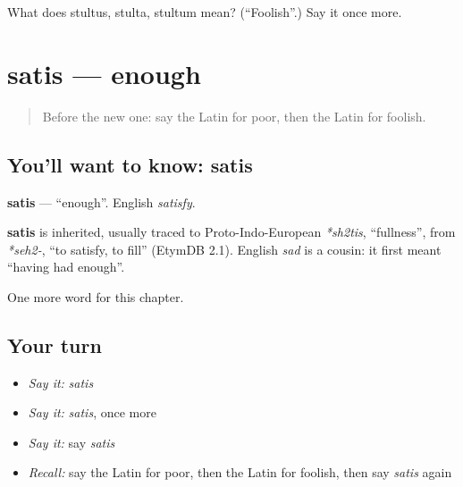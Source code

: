 \begin{tcolorbox}[breakable,colback=teal!4,colframe=teal!35!black,title={Before you move on}]
What does stultus, stulta, stultum mean? (\textquotedblleft{}Foolish\textquotedblright{}.) Say it once more.
\end{tcolorbox}
\section[satis]{satis — enough}

\label{lesson:LA-C98-satis}



\begin{quote}
Before the new one: say the Latin for poor, then the Latin for foolish.
\end{quote}

\subsection*{You'll want to know: satis}
\textbf{satis} — \textquotedblleft{}enough\textquotedblright{}. English \emph{satisfy}.

\begin{cousinweb}
\textbf{satis} is inherited, usually traced to Proto-Indo-European \emph{*sh2tis}, \textquotedblleft{}fullness\textquotedblright{}, from \emph{*seh2-}, \textquotedblleft{}to satisfy, to fill\textquotedblright{} (EtymDB 2.1). English \emph{sad} is a cousin: it first meant \textquotedblleft{}having had enough\textquotedblright{}.
\end{cousinweb}

\begin{grammarlens}[title={What you've built}]
One more word for this chapter.
\end{grammarlens}

\subsection*{Your turn}
\begin{itemize}
\raggedright
  \item \emph{Say it:} \emph{satis}
  \item \emph{Say it:} \emph{satis}, once more
  \item \emph{Say it:} say \emph{satis}
  \item \emph{Recall:} say the Latin for poor, then the Latin for foolish, then say \emph{satis} again
\end{itemize}

